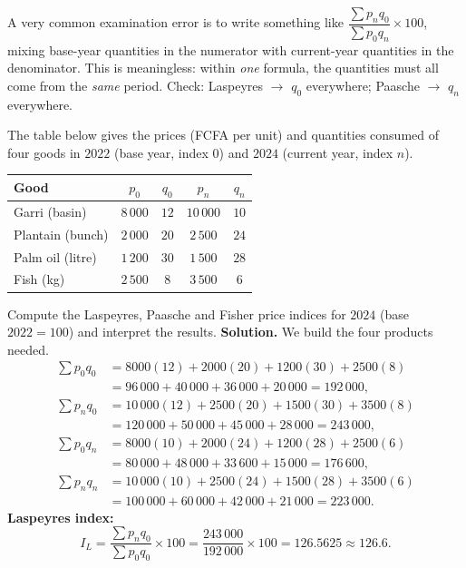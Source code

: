 \documentclass[11pt]{article}
\begin{document}
\begin{attention}
A very common examination error is to write something like $\dfrac{\sum p_n q_0}{\sum p_0 q_n}\times 100$, mixing base-year quantities in the numerator with current-year quantities in the denominator. This is meaningless: within \emph{one} formula, the quantities must all come from the \emph{same} period. Check: Laspeyres $\to$ $q_0$ everywhere; Paasche $\to$ $q_n$ everywhere.
\end{attention}

\begin{exoresolu}
The table below gives the prices (FCFA per unit) and quantities consumed of four goods in $2022$ (base year, index $0$) and $2024$ (current year, index $n$).
\begin{center}
\begin{tabular}{|l|c|c|c|c|}
\hline
\rowcolor{popblueL} Good & $p_0$ & $q_0$ & $p_n$ & $q_n$ \\
\hline
Garri (basin) & $8\,000$ & $12$ & $10\,000$ & $10$ \\
\hline
Plantain (bunch) & $2\,000$ & $20$ & $2\,500$ & $24$ \\
\hline
Palm oil (litre) & $1\,200$ & $30$ & $1\,500$ & $28$ \\
\hline
Fish (kg) & $2\,500$ & $8$ & $3\,500$ & $6$ \\
\hline
\end{tabular}
\end{center}
Compute the Laspeyres, Paasche and Fisher price indices for $2024$ (base $2022 = 100$) and interpret the results.
\tcblower
\textbf{Solution.} We build the four products needed.
\begin{align*}
\sum p_0 q_0 &= 8000(12)+2000(20)+1200(30)+2500(8)\\
&= 96\,000+40\,000+36\,000+20\,000 = 192\,000,\\
\sum p_n q_0 &= 10\,000(12)+2500(20)+1500(30)+3500(8)\\
&= 120\,000+50\,000+45\,000+28\,000 = 243\,000,\\
\sum p_0 q_n &= 8000(10)+2000(24)+1200(28)+2500(6)\\
&= 80\,000+48\,000+33\,600+15\,000 = 176\,600,\\
\sum p_n q_n &= 10\,000(10)+2500(24)+1500(28)+3500(6)\\
&= 100\,000+60\,000+42\,000+21\,000 = 223\,000.
\end{align*}
\textbf{Laspeyres index:}
\[ I_L = \frac{\sum p_n q_0}{\sum p_0 q_0}\times 100 = \frac{243\,000}{192\,000}\times 100 = 126.5625 \approx 126.6. \]

\end{exoresolu}
\end{document}
